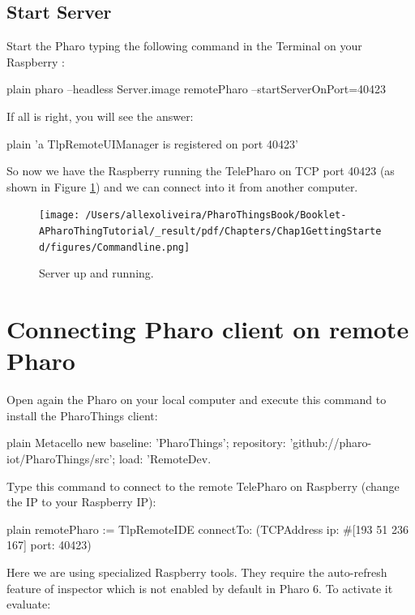 \documentclass[10pt,twoside,english]{_support/latex/sbabook/sbabook}
\begin{document}
\subsection{Start Server}
Start the Pharo typing the following command in the Terminal on your Raspberry :

\begin{displaycode}{plain}
pharo --headless Server.image remotePharo --startServerOnPort=40423
\end{displaycode}

If all is right, you will see the answer:

\begin{displaycode}{plain}
'a TlpRemoteUIManager is registered on port 40423'
\end{displaycode}

So now we have the Raspberry running the TelePharo on TCP port 40423 (as shown in Figure \ref{Commandline}) and we can connect into it from another computer.


\begin{figure}

\begin{center}
\texttt{[image: /Users/allexoliveira/PharoThingsBook/Booklet-APharoThingTutorial/\_result/pdf/Chapters/Chap1GettingStarted/figures/Commandline.png]}\caption{Server up and running.\label{Commandline}}\end{center}
\end{figure}

\section{Connecting Pharo client on remote Pharo}
Open again the Pharo on your local computer and execute this command to install the PharoThings client:

\begin{displaycode}{plain}
Metacello new
baseline: 'PharoThings';
repository: 'github://pharo-iot/PharoThings/src';
load: 'RemoteDev.
\end{displaycode}

Type this command to connect to the remote TelePharo on Raspberry (change the IP to your Raspberry IP):

\begin{displaycode}{plain}
remotePharo := TlpRemoteIDE connectTo: (TCPAddress ip: #[193 51 236 167] port: 40423)
\end{displaycode}

Here we are using specialized Raspberry tools. They require the auto-refresh feature of inspector which is not enabled by default in Pharo 6. To activate it evaluate:
\end{document}
